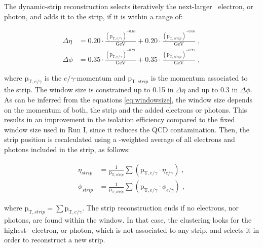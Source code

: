 \begin{itemize}
\noindent The dynamic-strip reconstruction selects iteratively the 
next-larger \pt~electron, or photon, and adds it to the strip, if 
it is within a range of:

\begin{equation} \label{eq:windowsize}
 \begin{aligned}
  \Delta\eta &= 0.20 \cdot \frac{(\textrm{p}_{\textrm{T},e/\gamma})^{-0.66}}{\textrm{GeV}} + 0.20 \cdot \frac{(\textrm{p}_{\textrm{T},strip})^{-0.66}}{\textrm{GeV}}  \;, \\
  \Delta\phi &= 0.35 \cdot \frac{(\textrm{p}_{\textrm{T},e/\gamma})^{-0.71}}{\textrm{GeV}} + 0.35 \cdot \frac{(\textrm{p}_{\textrm{T},strip})^{-0.71}}{\textrm{GeV}}  \;,
  \end{aligned}
\end{equation}

\noindent where $\textrm{p}_{\textrm{T},e/\gamma}$ is the $e/\gamma$-momentum and 
$\textrm{p}_{\textrm{T},strip}$ is the momentum associated to the strip. The window size is 
constrained up to 0.15 in $\Delta\eta$ and up to 0.3 
in $\Delta\phi$. As can be inferred from the equations \ref{eq:windowsize}, 
the window size depends on the momentum of both, the strip and the added
electrons or photons. This results in an improvement in the 
isolation efficiency compared to the fixed window size used in Run I,
since it reduces the QCD contamination. Then, 
the strip position is recalculated using a \pt-weighted average of all
electrons and photons included in the strip, as follows:

\begin{equation} \label{eq:stripposition}
 \begin{aligned}
  \eta_{strip} &=  \frac{1}{\textrm{p}_{\textrm{T},strip}} \sum \left(\textrm{p}_{\textrm{T},e/\gamma} \cdot \eta_{e/\gamma}\right) \;, \\
  \phi_{strip} &=  \frac{1}{\textrm{p}_{\textrm{T},strip}} \sum \left(\textrm{p}_{\textrm{T},e/\gamma} \cdot \phi_{e/\gamma}\right) \;,
  \end{aligned}
\end{equation}

\noindent where $\textrm{p}_{\textrm{T},strip} = \sum \textrm{p}_{\textrm{T},e/\gamma}$. The strip reconstruction
ends if no electrons, nor photons, are found within the window. In that case, the clustering 
looks for the highest-\pt~electron, or photon, which is not associated to any strip, and selects it 
in order to reconstruct a new strip. \\


\end{itemize}
